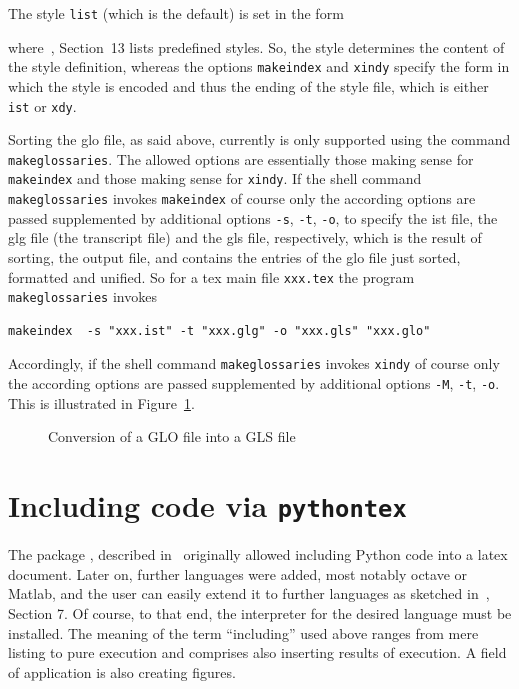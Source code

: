 The style \texttt{list} (which is the default) is set in the form 
%
\begin{taglstlisting}[language=TeX]
\usepackage[style=list]{glossaries}
\end{taglstlisting}
%
where~\cite{GloP4_54}, Section~13 lists predefined styles. 
So, the style determines the content of the style definition, 
whereas the options \texttt{makeindex} and \texttt{xindy} 
specify the form in which the style is encoded 
and thus the ending of the style file, 
which is either \texttt{ist} or \texttt{xdy}. 

Sorting the glo file, as said above, 
currently is only supported using the command \texttt{makeglossaries}. 
The allowed options are essentially those 
making sense for \texttt{makeindex} and those making sense for \texttt{xindy}. 
If the shell command \texttt{makeglossaries} 
invokes \texttt{makeindex} of course only the according options 
are passed supplemented by additional options 
\texttt{-s}, \texttt{-t}, \texttt{-o}, to specify the
ist file, the glg file (the transcript file) and the gls file,
respectively, 
which is the result of sorting, the output file, 
and contains the entries of the glo file 
just sorted, formatted and unified.
So for a tex main file \texttt{xxx.tex} the program 
\texttt{makeglossaries} invokes
%
\begin{verbatim}
makeindex  -s "xxx.ist" -t "xxx.glg" -o "xxx.gls" "xxx.glo"
\end{verbatim}
%
Accordingly, if the shell command \texttt{makeglossaries} 
invokes \texttt{xindy} of course only the according options 
are passed supplemented by additional options 
\texttt{-M}, \texttt{-t}, \texttt{-o}. 
This is illustrated in Figure~\ref{fig:glo2gls}. 


\begin{figure}[htb]
\centering
{}
\caption{\label{fig:glo2gls}Conversion of a GLO file into a GLS file }%
\end{figure}


\section{Including code via \texttt{pythontex}}\label{sec:pythontex}

The package , described in~\cite{PythonTexP} 
originally allowed including Python code into a latex document. 
Later on, further languages were added, most notably octave or Matlab, 
and the user can easily extend it to further languages 
as sketched in~\cite{PythonTexP}, Section 7. 
Of course, to that end, 
the interpreter for the desired language must be installed. 
The meaning of the term ``including'' used above 
ranges from mere listing to pure execution and comprises also inserting results of execution. 
A field of application is also creating figures. 

